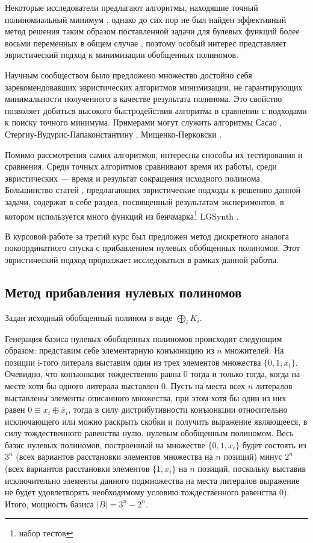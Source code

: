 \documentclass[a4paper,12pt,titlepage,finall]{article}
\begin{document}
Некоторые исследователи предлагают алгоритмы, находящие точный полиномиальный минимум \cite{min-tau} \cite{exact6} \cite{exact}, однако до сих пор не был найден эффективный метод решения таким образом поставленной задачи для булевых функций более восьми переменных в общем случае \cite{exact8}, поэтому особый интерес представляет эвристический подход к минимизации обобщенных полиномов.

Научным сообществом было предложено множество достойно себя зарекомендовавших эвристических алгоритмов минимизации, не гарантирующих минимальности полученного в качестве результата полинома. Это свойство позволяет добиться высокого быстродействия алгоритма в сравнении с подходами к поиску точного минимума. Примерами могут служить алгоритмы Сасао \cite{exmin2}, Стергиу-Вудурис-Папаконстантину \cite{mvesopmin}, Мищенко-Перковски \cite{exorcism4}.

Помимо рассмотрения самих алгоритмов, интересны способы их тестирования и сравнения. Среди точных алгоритмов сравнивают время их работы, среди эвристических --- время и результат сокращения исходного полинома. Большинство статей \cite{exmin2} \cite{mint} \cite{exorcism4}, предлагающих эвристические подходы к решению данной задачи, содержат в себе раздел, посвященный результатам экспериментов, в котором используется много функций из бенчмарка\footnote{набор тестов} LGSynth \cite{benchmark}.

В курсовой работе за третий курс был предложен метод дискретного аналога покоординатного спуска с прибавлением нулевых обобщенных полиномов. Этот эвристический подход продолжает исследоваться в рамках данной работы.

\subsection{Метод прибавления нулевых полиномов}

Задан исходный обобщенный полином в виде $ \bigoplus\limits_i K_i $.

Генерация базиса нулевых обобщенных полиномов происходит следующим образом: представим себе элементарную конъюнкцию из $ n $ множителей. На позиции i-того литерала выставим один из трех элементов множества $ \{ 0, 1, x_i \} $. Очевидно, что конъюнкция тождественно равна 0 тогда и только тогда, когда на месте хотя бы одного литерала выставлен 0. Пусть на места всех $ n $ литералов выставлены элементы описанного множества, при этом хотя бы один из них равен $ 0 \equiv x_i \oplus \overline x_i $, тогда в силу дистрибутивности конъюнкции относительно исключающего или можно раскрыть скобки и получить выражение являющееся, в силу тождественного равенства нулю, нулевым обобщенным полиномом. Весь базис нулевых полиномов, построенный на множестве $ \{ 0, 1, x_i \} $ будет состоять из $ 3^n $ (всех вариантов расстановки элементов множества на $ n $ позиций) минус $ 2^n $ (всех вариантов расстановки элементов $ \{ 1, x_i \} $ на $ n $ позиций, поскольку выставив исключительно элементы данного подмножества на места литералов выражение не будет удовлетворять необходимому условию тождественного равенства 0). Итого, мощность базиса $ \left| B \right| = 3^n - 2^n. $
\end{document}
